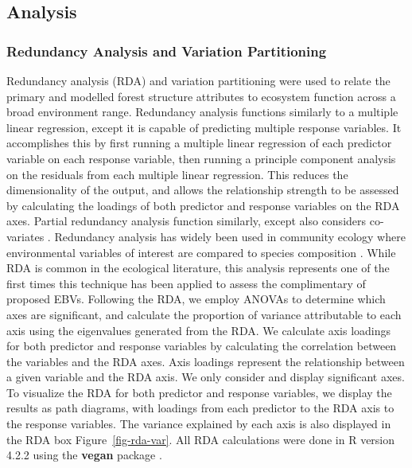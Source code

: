 \documentclass[
  authoryear,
  review,
  3p,
  twocolumn]{elsarticle}
\begin{document}
\hypertarget{analysis}{%
\subsection{Analysis}\label{analysis}}

\hypertarget{redundancy-analysis-and-variation-partitioning}{%
\subsubsection{Redundancy Analysis and Variation
Partitioning}\label{redundancy-analysis-and-variation-partitioning}}

Redundancy analysis (RDA) and variation partitioning were used to relate
the primary and modelled forest structure attributes to ecosystem
function across a broad environment range. Redundancy analysis functions
similarly to a multiple linear regression, except it is capable of
predicting multiple response variables. It accomplishes this by first
running a multiple linear regression of each predictor variable on each
response variable, then running a principle component analysis on the
residuals from each multiple linear regression. This reduces the
dimensionality of the output, and allows the relationship strength to be
assessed by calculating the loadings of both predictor and response
variables on the RDA axes. Partial redundancy analysis function
similarly, except also considers co-variates \citep{legendre2012}.
Redundancy analysis has widely been used in community ecology where
environmental variables of interest are compared to species composition
\citep{blanchet2014, kleyer2012}. While RDA is common in the ecological
literature, this analysis represents one of the first times this
technique has been applied to assess the complimentary of proposed EBVs.
Following the RDA, we employ ANOVAs to determine which axes are
significant, and calculate the proportion of variance attributable to
each axis using the eigenvalues generated from the RDA. We calculate
axis loadings for both predictor and response variables by calculating
the correlation between the variables and the RDA axes. Axis loadings
represent the relationship between a given variable and the RDA axis. We
only consider and display significant axes. To visualize the RDA for
both predictor and response variables, we display the results as path
diagrams, with loadings from each predictor to the RDA axis to the
response variables. The variance explained by each axis is also
displayed in the RDA box Figure~\ref{fig-rda-var}. All RDA calculations
were done in R \citep{R-base} version 4.2.2 using the \textbf{vegan}
package \citep{R-vegan}.
\end{document}
